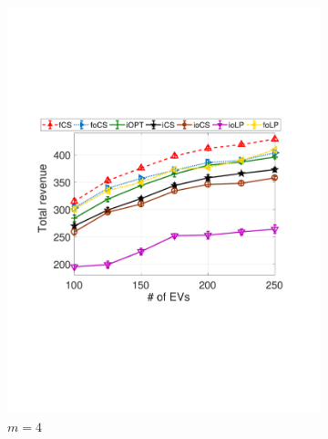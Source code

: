 \documentclass[journal]{IEEEtran}
\newcommand{\revv}[1]{{\color{black}#1}}%
\begin{document}
\begin{figure}[t]
\begin{subfigure}[b]{0.25\textwidth}
\begin{center}
						\includegraphics[width=\textwidth]{V-N-M4.pdf}
						\caption{\revv{$m=4$}}
						\label{fig:V-N-M4}
					\end{center}
				\end{subfigure}%
				\begin{subfigure}[b]{0.25\textwidth}
					\begin{center}

\end{center}
\end{subfigure}
\end{figure}
\end{document}
